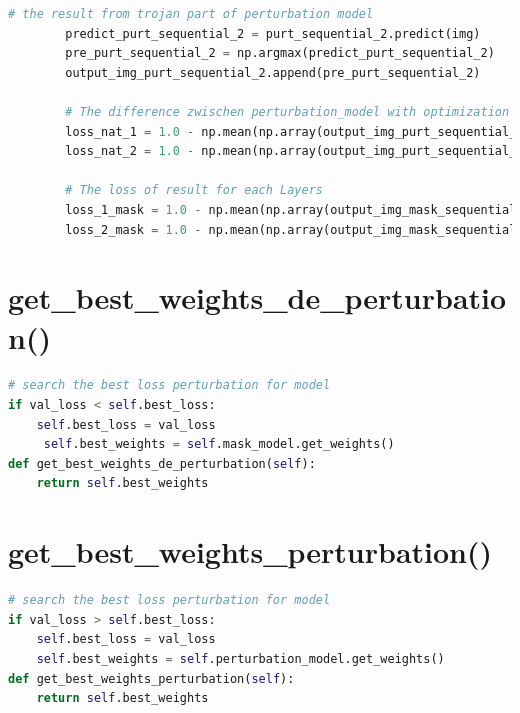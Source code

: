 \documentclass[english,version-2022-01]{uzl-thesis}
\begin{document}
\begin{lstlisting}[language=Python]
        # the result from trojan part of perturbation model
        predict_purt_sequential_2 = purt_sequential_2.predict(img)
        pre_purt_sequential_2 = np.argmax(predict_purt_sequential_2)
        output_img_purt_sequential_2.append(pre_purt_sequential_2)

        # The difference zwischen perturbation_model with optimization for each layers
        loss_nat_1 = 1.0 - np.mean(np.array(output_img_purt_sequential_1) == np.array(output_img_mask_sequential_1))
        loss_nat_2 = 1.0 - np.mean(np.array(output_img_purt_sequential_2) == np.array(output_img_mask_sequential_2))

        # The loss of result for each Layers
        loss_1_mask = 1.0 - np.mean(np.array(output_img_mask_sequential_1) == np.array(ValY))
        loss_2_mask = 1.0 - np.mean(np.array(output_img_mask_sequential_2) == np.array(ValY))
\end{lstlisting}

\section{get\_best\_weights\_de\_perturbation()}
\label{get_best_weights_de_perturbation()}
\begin{lstlisting}[language=Python]
# search the best loss perturbation for model
if val_loss < self.best_loss:
    self.best_loss = val_loss
     self.best_weights = self.mask_model.get_weights()
def get_best_weights_de_perturbation(self):
    return self.best_weights
\end{lstlisting}

\section{get\_best\_weights\_perturbation()}
\label{get_best_weights_perturbation()}
\begin{lstlisting}[language=Python]
# search the best loss perturbation for model
if val_loss > self.best_loss:
    self.best_loss = val_loss
    self.best_weights = self.perturbation_model.get_weights()
def get_best_weights_perturbation(self):
    return self.best_weights
\end{lstlisting}
\end{document}
